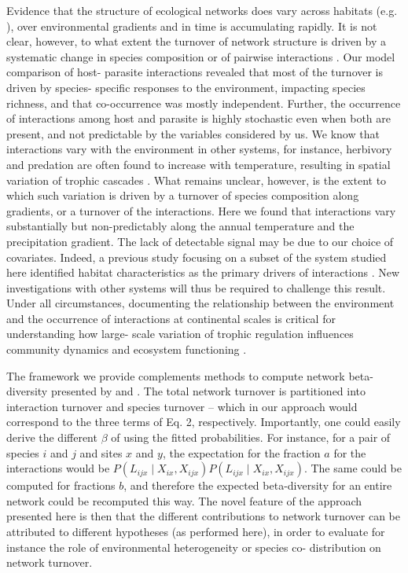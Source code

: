 \documentclass[12pt]{article}
\begin{document}
Evidence that the structure of ecological networks does vary across habitats
(e.g. \citealt{Tylianakis2007}), over environmental gradients
\citep{Lurgi2012} and in time \citep{Simanonok2014} is accumulating rapidly.
It is not clear, however, to what extent the turnover of network structure is
driven by a systematic change in species composition or of pairwise
interactions \citep{Poisot2012, Poisot2015a}. Our model comparison of host-
parasite interactions revealed that most of the turnover is driven by species-
specific responses to the environment, impacting species richness, and that
co-occurrence was mostly independent. Further, the occurrence of interactions
among host and parasite is highly stochastic even when both are present, and
not predictable by the variables considered by us. We know that interactions
vary with the environment in other systems, for instance, herbivory
\citep{Shurin2012, Baskett2018} and predation \citep{Mckinnon2010,
Legagneux2014} are often found to increase with temperature, resulting in
spatial variation of trophic cascades \citep{Gray2016}. What remains unclear,
however, is the extent to which such variation is driven by a turnover of
species composition along gradients, or a turnover of the interactions. Here
we found that interactions vary substantially but non-predictably along the
annual temperature and the precipitation gradient. The lack of detectable
signal may be due to our choice of covariates. Indeed, a previous study
focusing on a subset of the system studied here identified habitat
characteristics as the primary drivers of interactions \citep{Nyman2015}. New
investigations with other systems will thus be required to challenge this
result. Under all circumstances, documenting the relationship between the
environment and the occurrence of interactions at continental scales is
critical for understanding how large- scale variation of trophic regulation
influences community dynamics and ecosystem functioning \citep{Harfoot2014}.

The framework we provide complements methods to compute network beta-diversity
presented by \citealt{Poisot2012} and \citealt{Poisot2018}. The total network
turnover is partitioned into interaction turnover and species turnover – which
in our approach would correspond to the three terms of Eq. 2, respectively.
Importantly, one could easily derive the different $\beta$ of
\citealt{Poisot2012} using the fitted probabilities. For instance, for a pair
of species $i$ and $j$ and sites $x$ and $y$, the expectation for the fraction
$a$ for the interactions would be
$P(L_{ijx}\mid X_{ix},X_{ijx})P(L_{ijx}\mid X_{ix},X_{ijx})$. The same could be
computed for fractions $b$, and therefore the expected beta-diversity for an
entire network could be recomputed this way. The novel feature of the approach
presented here is then that the different contributions to network turnover
can be attributed to different hypotheses (as performed here), in order to
evaluate for instance the role of environmental heterogeneity or species co-
distribution on network turnover.
\end{document}

